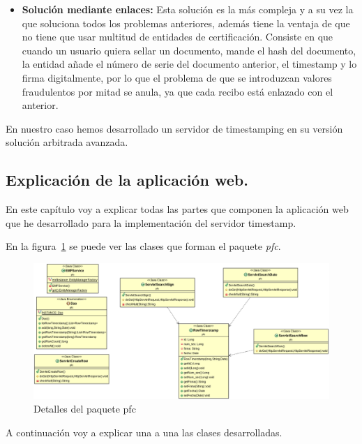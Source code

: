 \begin{itemize}
\item \textbf{Solución mediante enlaces:} Esta solución es la más compleja y a su vez la que soluciona todos los problemas anteriores, además tiene la ventaja de que no tiene que usar multitud de entidades de certificación. Consiste en que cuando un usuario quiera sellar un documento, mande el hash del documento, la entidad añade el número de serie del documento anterior, el timestamp y lo firma digitalmente, por lo que el problema de que se introduzcan valores fraudulentos por mitad se anula, ya que cada recibo está enlazado con el anterior.
\end{itemize}

En nuestro caso hemos desarrollado un servidor de timestamping en su versión solución arbitrada avanzada.


\subsection{Explicación de la aplicación web.}
En este capítulo voy a explicar todas las partes que componen la aplicación web que he desarrollado para la implementación del servidor timestamp.

En la figura~\ref{fig:paquete_pfc} se puede ver las clases que forman el paquete \textit{pfc}.

\begin{figure}
  \centering
    \includegraphics[scale=0.5]{./GoogleAppEngine/imagenes/UML_pfc.png}
  \caption{Detalles del paquete pfc}
  \label{fig:paquete_pfc}
\end{figure}

A continuación voy a explicar una a una las clases desarrolladas.

